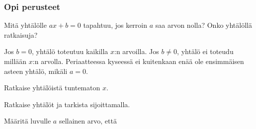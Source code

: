 \begin{tehtavasivu}

\subsubsection*{Opi perusteet}

\begin{tehtava}
Mitä yhtälölle $ax+b = 0$ tapahtuu, jos kerroin $a$ saa arvon nolla? Onko yhtälöllä ratkaisuja?
	\begin{vastaus}
Jos $b = 0$, yhtälö toteutuu kaikilla $x$:n arvoilla. Jos $b \neq 0$, yhtälö ei toteudu millään $x$:n arvolla. Periaatteessa kyseessä ei kuitenkaan enää ole ensimmäisen asteen yhtälö, mikäli $a = 0$.
	\end{vastaus}
\end{tehtava}

\begin{tehtava}
Ratkaise yhtälöistä tuntematon $x$.
	\begin{vastaus}
	\end{vastaus}
\end{tehtava}

\begin{tehtava}
Ratkaise yhtälöt ja tarkista sijoittamalla.
	\begin{vastaus}
	\end{vastaus}
\end{tehtava}


\begin{tehtava} %
Määritä luvulle $a$ sellainen arvo, että
	\begin{vastaus}
	\end{vastaus}
\end{tehtava}


\end{tehtavasivu}
